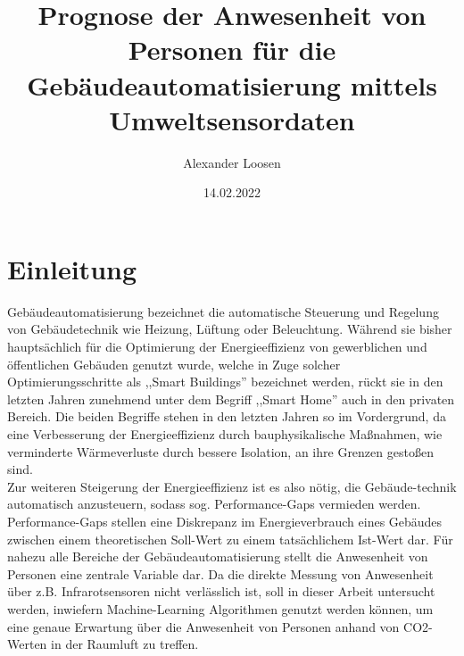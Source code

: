 \documentclass[letterpaper,12pt]{article}
\title{Prognose der Anwesenheit von Personen für die Gebäudeautomatisierung 
mittels Umweltsensordaten}
\author{Alexander Loosen}
\date{14.02.2022}
\begin{document}
\maketitle
\thispagestyle{empty}
\pagebreak
\section{Einleitung}
Gebäudeautomatisierung bezeichnet die automatische Steuerung und Regelung von Gebäudetechnik 
wie Heizung, Lüftung oder Beleuchtung. Während sie bisher hauptsächlich für die Optimierung 
der Energieeffizienz von gewerblichen und öffentlichen Gebäuden genutzt wurde, welche in 
Zuge solcher Optimierungsschritte als ,,Smart Buildings'' bezeichnet werden, 
rückt sie in den letzten Jahren zunehmend unter dem Begriff ,,Smart Home'' auch in den privaten 
Bereich. Die beiden Begriffe stehen in den letzten Jahren so im Vordergrund, da eine
Verbesserung der Energieeffizienz durch bauphysikalische Maßnahmen, wie verminderte 
Wärmeverluste durch bessere Isolation, an ihre Grenzen gestoßen sind.
\\
Zur weiteren Steigerung der Energieeffizienz ist es also nötig, die Gebäude-technik
automatisch anzusteuern, sodass sog. Performance-Gaps vermieden werden. Performance-Gaps
stellen eine Diskrepanz im Energieverbrauch eines Gebäudes zwischen einem theoretischen 
Soll-Wert zu einem tatsächlichem Ist-Wert dar.
Für nahezu alle Bereiche der Gebäudeautomatisierung stellt die Anwesenheit 
von Personen eine zentrale Variable dar. Da die direkte Messung von Anwesenheit über z.B. 
Infrarotsensoren nicht verlässlich ist, soll in dieser Arbeit untersucht werden, inwiefern 
Machine-Learning Algorithmen genutzt werden können, um eine genaue Erwartung über 
die Anwesenheit von Personen anhand von CO2-Werten in der Raumluft zu treffen.
\end{document}
